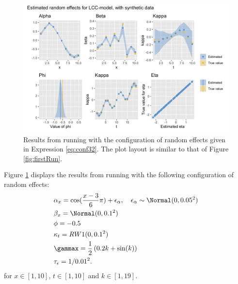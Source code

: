 \begin{figure}[h!]
    \centering
    \includegraphics[width=0.85\linewidth]{synthetic-data/Figures/effects-LCC-synthetic-3-2.png}
    \caption{Results from running \inlabru with the configuration of random effects given in Expression \ref{eq:conf32}. The plot layout is similar to that of Figure \ref{fig:firstRun}.}
    \label{fig:conf32}
\end{figure}
Figure \ref{fig:conf32} displays the results from running \inlabru with the following configuration of random effects:
\begin{equation}
    \begin{aligned}
        &\alpha_x = \cos(\frac{x-3}{6}\pi) + \epsilon_{\alpha}, \quad \epsilon_{\alpha} \sim \Normal(0,0.05^2)\\
        &\beta_x = \Normal(0,0.1^2)\\
        &\phi = -0.5\\
        &\kappa_t = RW1(0,0.1^2)\\
        &\gammax = \frac{1}{2}\left( 0.2k + \sin(k)\right)\\
        &\tau_{\epsilon} = 1/0.01^2.
    \end{aligned}
    \label{eq:conf32}
\end{equation}
for $x\in[1,10]$, $t \in [1,10]$ and $k \in [1,19]$. 

